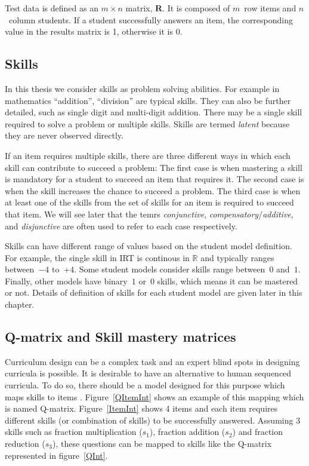 Test data is defined as an $m \times n$ matrix, $\mathbf{R}$. It is composed of $m$~row items and $n$~column students. If a student successfully answers an item, the corresponding value in the results matrix is 1, otherwise it is 0.

\subsection{Skills}

In this thesis we consider skills as problem solving abilities. For example in mathematics ``addition'', ``division'' are typical skills.  They can also be further detailed, such as single digit and multi-digit addition. There may be a single skill required to solve a problem or multiple skills. Skills are termed \textit{latent}  because they are never observed directly.

If an item requires multiple skills, there are three different ways in which each skill can contribute to succeed a problem: The first case is when mastering a skill is mandatory for a student to succeed an item that requires it. The second case is when the skill increases the chance to succeed a problem. The third case is when at least one of the skills from the set of skills for an item is required to succeed that item.  We will see later that the temrs \textit{conjunctive}, \textit{compensatory}/\textit{additive}, and \textit{disjunctive} are often used to refer to each case respectively.

Skills can have different range of values based on the student model definition. For example, the single skill in IRT is continous in $\mathbb{R}$ and typically ranges between~$-4$ to~$+4$. Some student models consider skills range between~$0$ and~$1$. Finally, other models have binary~$1$ or~$0$ skills, which means it can be mastered or not. Details of definition of skills for each student model are given later in this chapter.

\subsection{Q-matrix and Skill mastery matrices}


Curriculum design can be a complex task and an expert blind spots in designing curricula is possible. It is desirable to have an alternative to human sequenced curricula. To do so, there should be a model designed for this purpose which maps skills to items \citep{Tatsuoka1983,Tatsuoka2009}. Figure~\ref{QItemInt} shows an example of this mapping which is named  Q-matrix.  Figure~\ref{ItemInt} shows 4 items and each item requires different skills (or combination of skills) to be successfully answered. Assuming 3 skills such as fraction multiplication ($s_{1}$), fraction addition ($s_{2}$) and fraction reduction ($s_{3}$), these questions can be mapped to skills like the Q-matrix represented in figure~\protect\ref{QInt}. 

